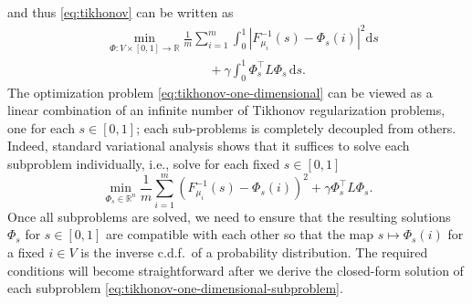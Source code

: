 \documentclass[letterpaper]{article} %
\begin{document}
and thus \eqref{eq:tikhonov} can be written as
\begin{equation}\label{eq:tikhonov-one-dimensional}
  \begin{aligned}
      &\min_{\Phi:V\times \left[ 0,1 \right]\rightarrow \mathbb{R}}\frac{1}{m}\sum_{i=1}^m\int_0^1 \left| F_{\mu_i}^{-1}\left( s \right)-\Phi_s \left( i \right) \right|^2\mathrm{d}s\\
      &\qquad \qquad\qquad \qquad +\gamma\int_0^1\Phi_s^{\top}L\Phi_s\,\mathrm{d}s.
  \end{aligned}
\end{equation}
The optimization problem \eqref{eq:tikhonov-one-dimensional} can be viewed as a linear combination of an infinite number of Tikhonov regularization problems, one for each $s\in \left[ 0,1 \right]$; each sub-problems is completely decoupled from others. Indeed, standard variational analysis shows that it suffices to solve each subproblem individually, i.e., solve for each fixed $s\in  \left[ 0,1 \right]$
\begin{equation}
  \label{eq:tikhonov-one-dimensional-subproblem}
  \min_{\Phi_s\in\mathbb{R}^n}\frac{1}{m}\sum_{i=1}^m \left( F_{\mu_i}^{-1}\left( s \right)-\Phi_s \left( i \right) \right)^2+\gamma \Phi_s^{\top}L\Phi_s.
\end{equation}
Once all subproblems are solved,  we need to ensure that the resulting solutions $\Phi_s$ for $s\in \left[ 0,1 \right]$ are compatible with each other so that the map $s\mapsto \Phi_s \left( i \right)$ for a fixed $i\in V$ is the inverse c.d.f.\ of a probability distribution. The required conditions will become straightforward after we derive the closed-form solution of each subproblem \eqref{eq:tikhonov-one-dimensional-subproblem}.
\end{document}
